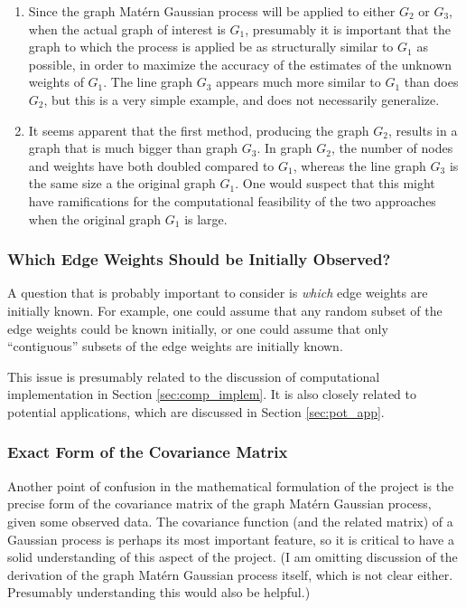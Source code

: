 \begin{enumerate}
    \item Since the graph Mat\'{e}rn Gaussian process will be applied to either $G_2$ or $G_3$, when the actual graph of interest is $G_1$, presumably it is important that the graph to which the process is applied be as structurally similar to $G_1$ as possible, in order to maximize the accuracy of the estimates of the unknown weights of $G_1$. The line graph $G_3$ appears much more similar to $G_1$ than does $G_2$, but this is a very simple example, and does not necessarily generalize.
    \item It seems apparent that the first method, producing the graph $G_2$, results in a graph that is much bigger than graph $G_3$. In graph $G_2$, the number of nodes and weights have both doubled compared to $G_1$, whereas the line graph $G_3$ is the same size a the original graph $G_1$. One would suspect that this might have ramifications for the computational feasibility of the two approaches when the original graph $G_1$ is large.
\end{enumerate}


\subsubsection{Which Edge Weights Should be Initially Observed?}

A question that is probably important to consider is \textit{which} edge weights are initially known. For example, one could assume that any random subset of the edge weights could be known initially, or one could assume that only ``contiguous'' subsets of the edge weights are initially known.

This issue is presumably related to the discussion of computational implementation in Section \ref{sec:comp_implem}. It is also closely related to potential applications, which are discussed in Section \ref{sec:pot_app}.

\subsubsection{Exact Form of the Covariance Matrix}

Another point of confusion in the mathematical formulation of the project is the precise form of the covariance matrix of the graph Mat\'{e}rn Gaussian process, given some observed data. The covariance function (and the related matrix) of a Gaussian process is perhaps its most important feature, so it is critical to have a solid understanding of this aspect of the project. (I am omitting discussion of the derivation of the graph Mat\'{e}rn Gaussian process itself, which is not clear either. Presumably understanding this would also be helpful.)

